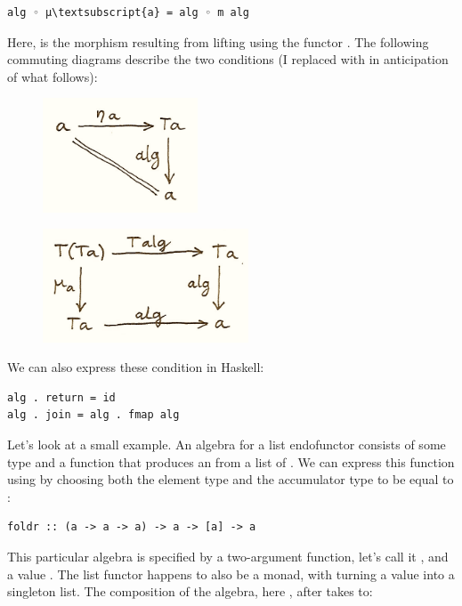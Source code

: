 \begin{Verbatim}[commandchars=\\\{\}]
alg ◦ μ\textsubscript{a} = alg ◦ m alg
\end{Verbatim}
Here,  is the morphism resulting from lifting
 using the functor . The following commuting
diagrams describe the two conditions (I replaced  with
 in anticipation of what follows):

\begin{figure}[H]
\centering
\includegraphics[width=1.81250in]{images/talg1.png}
\end{figure}

\begin{figure}[H]
\centering
\includegraphics[width=2.40625in]{images/talg2.png}
\end{figure}

\noindent
We can also express these condition in Haskell:

\begin{verbatim}
alg . return = id
alg . join = alg . fmap alg
\end{verbatim}
Let's look at a small example. An algebra for a list endofunctor
consists of some type  and a function that produces an
 from a list of . We can express this function using
 by choosing both the element type and the accumulator
type to be equal to :

\begin{verbatim}
foldr :: (a -> a -> a) -> a -> [a] -> a
\end{verbatim}
This particular algebra is specified by a two-argument function, let's
call it , and a value . The list functor happens to
also be a monad, with  turning a value into a singleton
list. The composition of the algebra, here , after
 takes  to:

